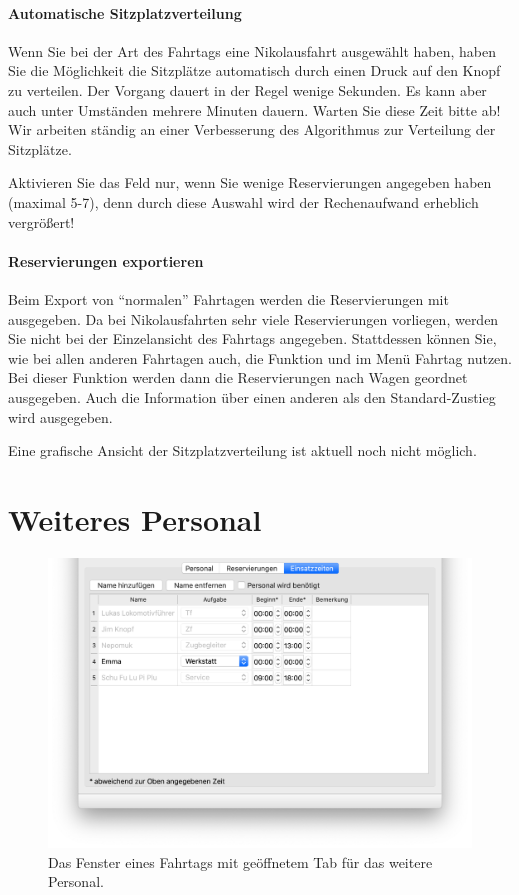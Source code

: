 \paragraph{Automatische Sitzplatzverteilung}
Wenn Sie bei der Art des Fahrtags eine Nikolausfahrt ausgewählt haben, haben Sie die Möglichkeit die Sitzplätze automatisch durch einen Druck auf den Knopf  zu verteilen.
Der Vorgang dauert in der Regel wenige Sekunden.
Es kann aber auch unter Umständen mehrere Minuten dauern.
Warten Sie diese Zeit bitte ab!
Wir arbeiten ständig an einer Verbesserung des Algorithmus zur Verteilung der Sitzplätze.

\begin{hinweis}
  Aktivieren Sie das Feld  nur, wenn Sie wenige Reservierungen angegeben haben (maximal 5-7),
  denn durch diese Auswahl wird der Rechenaufwand erheblich vergrößert!
\end{hinweis}


\paragraph{Reservierungen exportieren}
Beim Export von \enquote{normalen} Fahrtagen werden die Reservierungen mit ausgegeben.
Da bei Nikolausfahrten sehr viele Reservierungen vorliegen, werden Sie nicht bei der Einzelansicht des Fahrtags angegeben.
Stattdessen können Sie, wie bei allen anderen Fahrtagen auch,
die Funktion  und  im Menü Fahrtag nutzen.
Bei dieser Funktion werden dann die Reservierungen nach Wagen geordnet ausgegeben.
Auch die Information über einen anderen als den Standard-Zustieg wird ausgegeben.

Eine grafische Ansicht der Sitzplatzverteilung ist aktuell noch nicht möglich.



\section{Weiteres Personal}
\begin{figure}[!h]
	\includegraphics[width=\textwidth]{img/fahrtag_einsatzzeiten}
	\caption{Das Fenster eines Fahrtags mit geöffnetem Tab für das weitere Personal.}
	\label{fig:einsatz:fahrtag:einsatzzeiten}
\end{figure}

